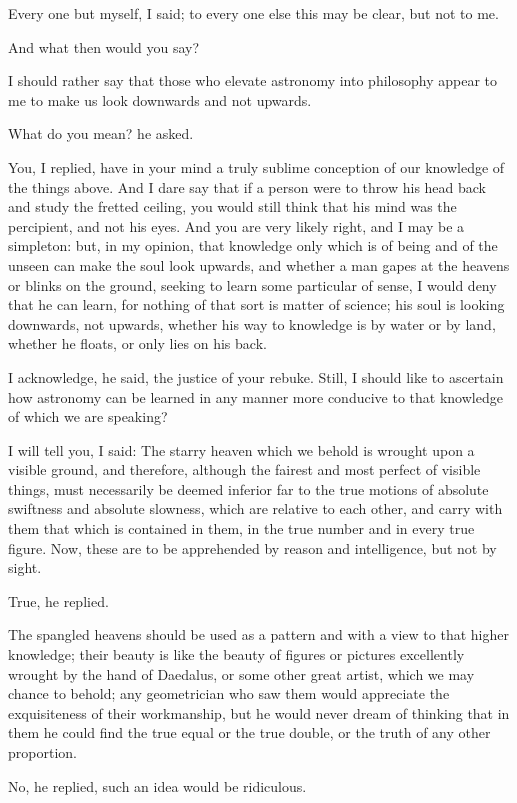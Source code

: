 Every one but myself, I said; to every one else this may be clear, but
not to me.

And what then would you say?

I should rather say that those who elevate astronomy into philosophy
appear to me to make us look downwards and not upwards.

What do you mean? he asked.

You, I replied, have in your mind a truly sublime conception of our
knowledge of the things above. And I dare say that if a person were to
throw his head back and study the fretted ceiling, you would still think
that his mind was the percipient, and not his eyes. And you are very
likely right, and I may be a simpleton: but, in my opinion, that
knowledge only which is of being and of the unseen can make the soul
look upwards, and whether a man gapes at the heavens or blinks on the
ground, seeking to learn some particular of sense, I would deny that he
can learn, for nothing of that sort is matter of science; his soul is
looking downwards, not upwards, whether his way to knowledge is by water
or by land, whether he floats, or only lies on his back.

I acknowledge, he said, the justice of your rebuke. Still, I should like
to ascertain how astronomy can be learned in any manner more conducive
to that knowledge of which we are speaking?

I will tell you, I said: The starry heaven which we behold is wrought
upon a visible ground, and therefore, although the fairest and most
perfect of visible things, must necessarily be deemed inferior far to
the true motions of absolute swiftness and absolute slowness, which are
relative to each other, and carry with them that which is contained in
them, in the true number and in every true figure. Now, these are to be
apprehended by reason and intelligence, but not by sight.

True, he replied.

The spangled heavens should be used as a pattern and with a view to that
higher knowledge; their beauty is like the beauty of figures or pictures
excellently wrought by the hand of Daedalus, or some other great artist,
which we may chance to behold; any geometrician who saw them would
appreciate the exquisiteness of their workmanship, but he would never
dream of thinking that in them he could find the true equal or the true
double, or the truth of any other proportion.

No, he replied, such an idea would be ridiculous.

